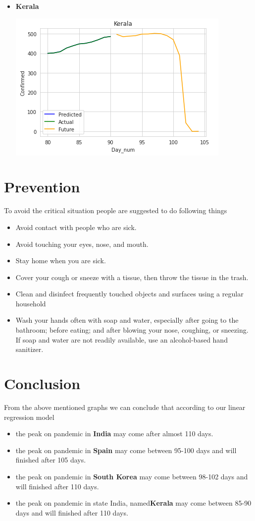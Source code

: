 \documentclass{article}
\begin{document}
\begin{itemize}
\begin{center}
\end{center}
\item \textbf{Kerala}
\begin{center}
\includegraphics[scale=0.5]{corona_8_kerala.png}
\end{center}
\end{itemize}
\clearpage
\section*{Prevention}
To avoid the critical situation people are suggested to do following things
\begin{itemize}
\item Avoid contact with people who are sick.
\item Avoid touching your eyes, nose, and mouth.
\item Stay home when you are sick.
\item Cover your cough or sneeze with a tissue, then throw the tissue in the trash.
\item Clean and disinfect frequently touched objects and surfaces using a regular household
\item Wash your hands often with soap and water, especially after going to the bathroom; before eating; and after blowing your nose, coughing, or sneezing. If soap and water are not readily available, use an alcohol-based hand sanitizer.
\end{itemize}

\section*{Conclusion}
From the above mentioned graphs we can conclude that according to our linear regression model 
\begin{itemize}
\item the peak on pandemic in \textbf{India} may come after almost 110 days.
\item the peak on pandemic in \textbf{Spain} may come between 95-100 days and will finished after 105 days.
\item the peak on pandemic in \textbf{South Korea} may come between 98-102 days and will finished after 110 days.
\item the peak on pandemic in state  India, named\textbf{Kerala} may come between 85-90 days and will finished after 110 days.

\end{itemize}
\clearpage
\end{document}
